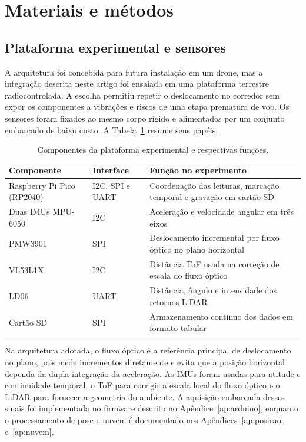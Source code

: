 \section{Materiais e métodos}
\label{sec:metodos}

\subsection{Plataforma experimental e sensores}

A arquitetura foi concebida para futura instalação em um drone, mas a integração descrita neste artigo foi ensaiada em uma plataforma terrestre radiocontrolada. A escolha permitiu repetir o deslocamento no corredor sem expor os componentes a vibrações e riscos de uma etapa prematura de voo. Os sensores foram fixados ao mesmo corpo rígido e alimentados por um conjunto embarcado de baixo custo. A Tabela~\ref{tab:componentes} resume seus papéis.

\begin{table}[htbp]
    \centering
    \caption{Componentes da plataforma experimental e respectivas funções.}
    \label{tab:componentes}
    \begin{tabularx}{\textwidth}{@{}l l X@{}}
        \toprule
        \textbf{Componente} & \textbf{Interface} & \textbf{Função no experimento} \\
        \midrule
        Raspberry Pi Pico (RP2040) & I2C, SPI e UART & Coordenação das leituras, marcação temporal e gravação em cartão SD \\
        Duas IMUs MPU-6050 & I2C & Aceleração e velocidade angular em três eixos \\
        PMW3901 & SPI & Deslocamento incremental por fluxo óptico no plano horizontal \\
        VL53L1X & I2C & Distância ToF usada na correção de escala do fluxo óptico \\
        LD06 & UART & Distância, ângulo e intensidade dos retornos LiDAR \\
        Cartão SD & SPI & Armazenamento contínuo dos dados em formato tabular \\
        \bottomrule
    \end{tabularx}
\end{table}

Na arquitetura adotada, o fluxo óptico é a referência principal de deslocamento no plano, pois mede incrementos diretamente e evita que a posição horizontal dependa da dupla integração da aceleração. As IMUs foram usadas para atitude e continuidade temporal, o ToF para corrigir a escala local do fluxo óptico e o LiDAR para fornecer a geometria do ambiente. A aquisição embarcada desses sinais foi implementada no firmware descrito no Apêndice~\ref{ap:arduino}, enquanto o processamento de pose e nuvem é documentado nos Apêndices~\ref{ap:posicao} e~\ref{ap:nuvem}.

